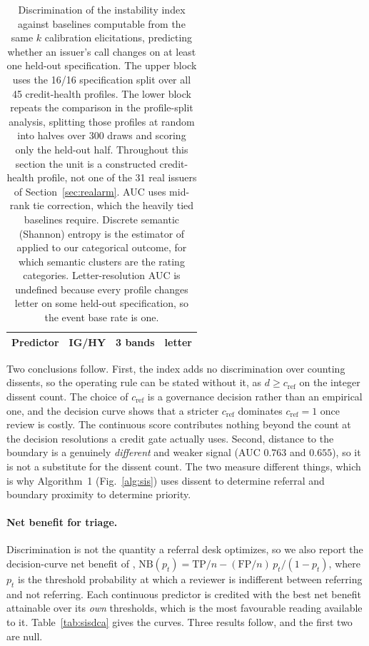 \documentclass[a4paper,fleqn]{cas-sc}
\begin{document}
\begin{table}[t]\centering
\caption{Discrimination of the instability index against baselines computable from the same $k$
calibration elicitations, predicting whether an issuer's call changes on at least one held-out
specification. The upper block uses the 16/16 specification split over all 45 credit-health
profiles. The lower block repeats the comparison in the profile-split analysis, splitting those
profiles at random into halves over 300 draws and scoring only the held-out half. Throughout
this section the unit is a constructed credit-health profile, not one of the 31 real issuers of
Section~\ref{sec:realarm}. AUC uses mid-rank tie correction, which the
heavily tied baselines require. Discrete semantic (Shannon) entropy is the estimator of
\citet{farquhar2024semantic} applied to our categorical outcome, for which semantic clusters are
the rating categories. Letter-resolution AUC is undefined because every profile changes letter on
some held-out specification, so the event base rate is one.}
\label{tab:sisbase}
\begin{tabular}{lccc}\toprule
Predictor & IG/HY & 3 bands & letter \\\midrule%

\end{tabular}\end{table}

Two conclusions follow. First, the index adds no discrimination over counting dissents, so the
operating rule can be stated without it, as $d\ge c_{\mathrm{ref}}$ on the integer dissent count. The choice of $c_{\mathrm{ref}}$
is a governance decision rather than an empirical one, and the decision curve shows that a stricter $c_{\mathrm{ref}}$ dominates $c_{\mathrm{ref}}=1$ once review is costly.  The continuous score contributes
nothing beyond the count at the decision resolutions a credit gate actually uses. Second, distance
to the boundary is a genuinely \emph{different} and weaker signal (AUC $0.763$ and $0.655$), so it is
not a substitute for the dissent count. The two measure different things, which is why
Algorithm~1 (Fig.~\ref{alg:sis}) uses dissent to determine referral and boundary proximity to determine priority.

\paragraph{Net benefit for triage.}
Discrimination is not the quantity a referral desk optimizes, so we also report the decision-curve
net benefit of \citet{vickers2006dca},
$\mathrm{NB}(p_t)=\mathrm{TP}/n-(\mathrm{FP}/n)\,p_t/(1-p_t)$, where $p_t$ is the
threshold probability at which a reviewer is indifferent between referring and not referring. Each
continuous predictor is credited with the best net benefit attainable over its \emph{own}
thresholds, which is the most favourable reading available to it. Table~\ref{tab:sisdca} gives the
curves. Three results follow, and the first two are null.
\end{document}
